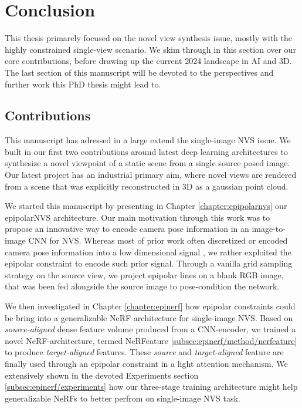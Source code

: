 \chapter{Conclusion}
\label{chapter:conclusion}



This thesis primarely focused on the novel view synthesis issue, mostly with the highly constrained single-view scenario. We skim through in this section over our core contributions, before drawing up  the current 2024 landscape in \ac{AI} and 3D. The last section of this manuscript will be devoted to the perspectives and further work this PhD thesis might lead to. 

\section{Contributions}

This manuscript has adressed in a large extend the single-image \ac{NVS} issue. We built in our first two contributions around latest deep learning architectures to synthesize a novel viewpoint of a static scene from a single source posed image. Our latest project has an industrial primary aim, where novel views are rendered from a scene that was explicitly reconstructed in 3D as a gaussian point cloud.

We started this manuscript by presenting in Chapter \ref{chapter:epipolarnvs} our epipolarNVS architecture. Our main motivation through this work was to propose an innovative way to encode camera pose information in an image-to-image \ac{CNN} for \ac{NVS}. Whereas most of prior work often discretized \citep{kim2020novel} or encoded camera pose information into a low dimensional signal \citep{sun2018multiview}, we rather exploited the epipolar constraint to encode such prior signal. Through a vanilla grid sampling strategy on the source view, we project epipolar lines on a blank RGB image, that was been fed alongside the source image to pose-condition the network. 

We then investigated in Chapter \ref{chapter:epinerf} how epipolar constraints could be bring into a generalizable \ac{NeRF} architecture for single-image \ac{NVS}. Based on \textit{source-aligned} dense feature volume produced from a CNN-encoder, we trained a novel \ac{NeRF}-architecture, termed NeRFeature \ref{subsec:epinerf/method/nerfeature} to produce \textit{target-aligned} features. These \textit{source} and \textit{target-aligned} feature are finally used through an epipolar constraint in a light attention mechanism. We extensively shown in the devoted Experiments section \ref{subsec:epinerf/experiments} how our three-stage training architecture might help generalizable \ac{NeRF}s to better perfrom on single-image \ac{NVS} task.  

